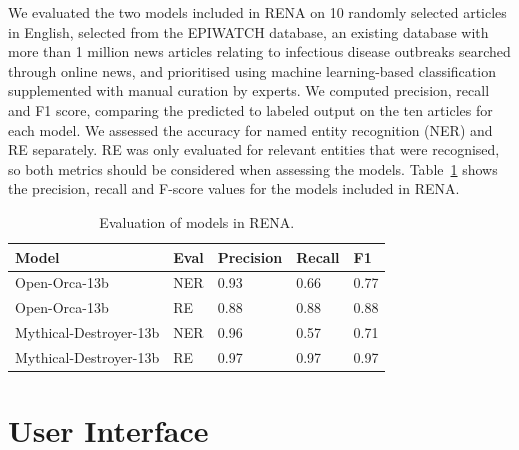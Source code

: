 \documentclass[letterpaper]{article} %
\begin{document}
We evaluated the two models included in RENA on 10 randomly selected articles in English, selected from the EPIWATCH database, an existing database with more than 1 million news articles relating to infectious disease outbreaks searched through online news, and prioritised using machine learning-based classification supplemented with manual curation by experts. We computed precision, recall and F1 score, comparing the predicted to labeled output on the ten articles for each model. We assessed the accuracy for named entity recognition (NER) and RE separately. RE was only evaluated for relevant entities that were recognised, so both metrics should be considered when assessing the models. Table~\ref{tab1} shows the precision, recall and F-score values for the models included in RENA.



\begin{table}[]
\begin{tabular}{lllll}
\toprule
 Model  & Eval & Precision &  Recall  &  F1  \\ \midrule
 Open-Orca-13b &  NER & 0.93 & 0.66 & 0.77 \\
 Open-Orca-13b  & RE  & 0.88 & 0.88 & 0.88 \\
 Mythical-Destroyer-13b  & NER & 0.96  & 0.57 & 0.71 \\
 Mythical-Destroyer-13b & RE & 0.97 & 0.97 & 0.97 \\ \bottomrule
\end{tabular}
\caption{Evaluation of models in RENA.}
\label{tab1}
\end{table}


\section{User Interface}
\end{document}
